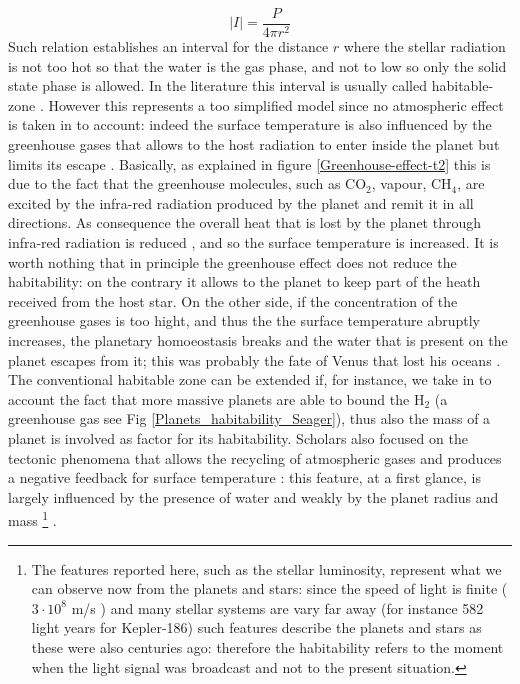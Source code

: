\documentclass[
12pt, %
a4paper, %
oneside, %
headinclude,footinclude, %
BCOR5mm, %
]{scrartcl}
\begin{document}
\begin{equation}
\lvert I \rvert=\dfrac{P}{4\pi r^{2}}
\end{equation}
Such relation establishes an interval for the distance $r$ where the stellar radiation is not too hot so that the water is the gas phase, and not to low so only the solid state phase is allowed. In the literature this interval is usually called habitable-zone \cite{kasting1993habitable}. However this represents a too simplified model since no atmospheric effect is taken in to account: indeed the surface temperature is also influenced by the greenhouse gases that allows to the host radiation to enter inside the planet but limits its escape \cite{seager2013exoplanet,forget2014possible}. Basically, as explained in figure \ref{Greenhouse-effect-t2} this is due to the fact that the greenhouse molecules, such as CO$_{2}$, vapour, CH$_{4}$, are excited by the infra-red radiation produced by the planet and remit it in all directions. As consequence the overall heat that is lost by the planet through infra-red radiation is reduced \cite{pierrehumbert2011infrared}, and so the surface temperature is increased. It is worth nothing that in principle the greenhouse effect does not reduce the habitability: on the contrary it allows to the planet to keep part of the heath received from the host star. On the other side, if the concentration of the greenhouse gases is too hight, and thus the the surface temperature abruptly increases, the planetary homoeostasis\cite{lovelock1974atmospheric,lovelock1982life,caldeira1992life} breaks and the water that is present on the planet escapes from it; this was probably the fate of Venus that lost his oceans \cite{way2016venus,luger2015extreme,seager2013exoplanet}. The conventional habitable zone can be extended if, for instance, we take in to account the fact that more massive planets are able to bound the H$_{2}$ (a greenhouse gas see Fig \ref{Planets_habitability_Seager}), thus also the mass of a planet is involved as factor for its habitability. Scholars \cite{tackley2012habitable} also focused on the tectonic phenomena that allows the recycling of atmospheric gases and produces a negative feedback for surface temperature \cite{walker1981negative}: this feature, at a first glance, is largely influenced by the presence of water \cite{korenaga2010likelihood,o2007geological} and weakly by the planet radius \cite{o2007geological} and mass \cite{korenaga2010likelihood}\footnote{The features reported here, such as the stellar luminosity, represent what we can observe now from the planets and stars: since the speed of light is finite ($3\cdot10^{8}$ m/s ) and many stellar systems are vary far away (for instance 582 light years for Kepler-186) such features describe the planets and stars as these were also centuries ago: therefore the habitability refers to the moment when the light signal was broadcast and not to the present situation.} .  
  
\end{document}
